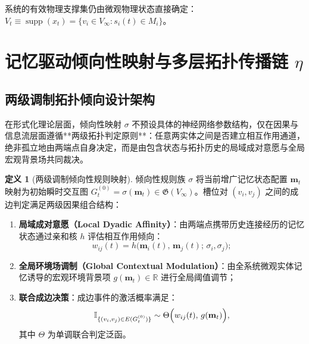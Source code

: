 \documentclass[11pt,a4paper]{article}
\numberwithin{equation}{section}
\theoremstyle{definition}
\newtheorem{definition}{定义}[section]
\theoremstyle{remark}
\DeclareMathOperator{\supp}{\mathrm{supp}} %
\begin{document}
	系统的有效物理支撑集仍由微观物理状态直接确定：$V_t \equiv \supp(x_t) = \{v_i\in V_\infty: s_i(t)\in M_i\}$。
	
	\section{\texorpdfstring{记忆驱动倾向性映射与多层拓扑传播链 $\eta$}{记忆驱动倾向性映射与多层拓扑传播链 η}}\label{sec:sigma-eta}
	
	\subsection{\texorpdfstring{两级调制拓扑倾向设计架构}{两级调制拓扑倾向设计架构}}\label{sec:sigma-two-tier-design}

	在形式化理论层面，倾向性映射 $\sigma$ 不预设具体的神经网络参数结构，仅在因果与信息流层面遵循**两级拓扑判定原则**：任意两实体之间是否建立相互作用通道，绝非孤立地由两端点自身决定，而是由包含状态与拓扑历史的局域成对意愿与全局宏观背景场共同裁决。

	\begin{definition}[两级调制倾向性规则映射]\label{def:modulated-sigma}
		倾向性规则族 $\sigma$ 将当前增广记忆状态配置 $\mathbf{m}_t$ 映射为初始瞬时交互图 $G_t^{(0)} = \sigma(\mathbf{m}_t) \in \mathfrak{G}(V_\infty)$。槽位对 $(v_i, v_j)$ 之间的成边判定满足两级因果组合结构：
		\begin{enumerate}[label=(\arabic*), leftmargin=2.4em]
			\item \textbf{局域成对意愿（Local Dyadic Affinity）}：由两端点携带历史连接经历的记忆状态通过亲和核 $h$ 评估相互作用倾向：
			\begin{equation}
				w_{ij}(t) = h\bigl(\mathbf{m}_i(t),\, \mathbf{m}_j(t);\, \sigma_i, \sigma_j\bigr);
				\label{eq:local-affinity}
			\end{equation}
			\item \textbf{全局环境场调制（Global Contextual Modulation）}：由全系统微观实体记忆诱导的宏观环境背景项 $g(\mathbf{m}_t) \in \mathbb{R}$ 进行全局阈值调节；
			\item \textbf{联合成边决策}：成边事件的激活概率满足：
			\begin{equation}
				\mathbb{I}_{\{(v_i, v_j) \in E(G_t^{(0)})\}} \sim \Theta\Bigl(w_{ij}(t),\, g(\mathbf{m}_t)\Bigr),
				\label{eq:modulated-edge-decision}
			\end{equation}
			其中 $\Theta$ 为单调联合判定泛函。
		\end{enumerate}
	\end{definition}
\end{document}
